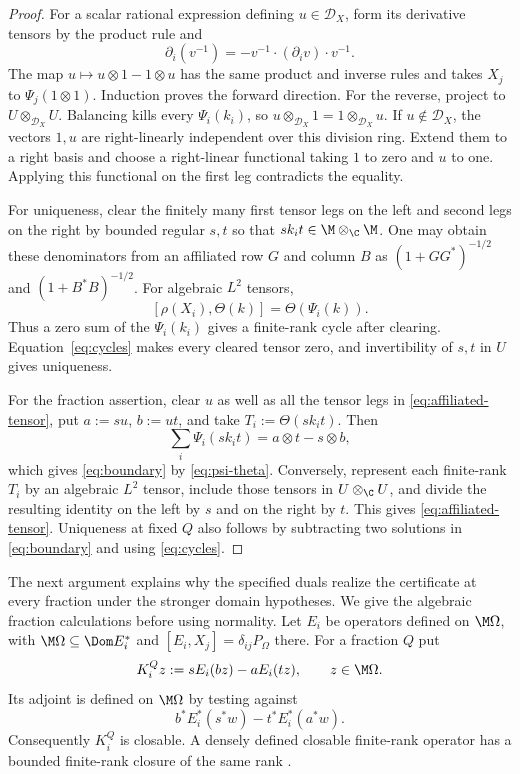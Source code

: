 \begin{proof}
For a scalar rational expression defining $u\in\mathcal D_X$, form its derivative tensors by the product rule and
\[
 \partial_i(v^{-1})=-v^{-1}\cdot(\partial_i v)\cdot v^{-1}.
\]
The map $u\mapsto u\otimes1-1\otimes u$ has the same product and inverse rules and takes $X_j$ to $\Psi_j(1\otimes1)$.
Induction proves the forward direction.
For the reverse, project to $U\otimes_{\mathcal D_X}U$.
Balancing kills every $\Psi_i(k_i)$, so $u\otimes_{\mathcal D_X}1=1\otimes_{\mathcal D_X}u$.
If $u\notin\mathcal D_X$, the vectors $1,u$ are right-linearly independent over this division ring.
Extend them to a right basis and choose a right-linear functional taking $1$ to zero and $u$ to one.
Applying this functional on the first leg contradicts the equality.

For uniqueness, clear the finitely many first tensor legs on the left and second legs on the right by bounded regular $s,t$ so that $sk_it\in\M\otimes_\C\M$.
One may obtain these denominators from an affiliated row $G$ and column $B$ as $(1+GG^*)^{-1/2}$ and $(1+B^*B)^{-1/2}$.
For algebraic $L^2$ tensors,
\begin{equation}\label{eq:psi-theta}
 [\rho(X_i),\Theta(k)]=\Theta(\Psi_i(k)).
\end{equation}
Thus a zero sum of the $\Psi_i(k_i)$ gives a finite-rank cycle after clearing.
Equation~\eqref{eq:cycles} makes every cleared tensor zero, and invertibility of $s,t$ in $U$ gives uniqueness.

For the fraction assertion, clear $u$ as well as all the tensor legs in \eqref{eq:affiliated-tensor}, put $a:=su$, $b:=ut$, and take $T_i:=\Theta(sk_it)$.
Then
\[
 \sum_i\Psi_i(sk_it)=a\otimes t-s\otimes b,
\]
which gives \eqref{eq:boundary} by \eqref{eq:psi-theta}.
Conversely, represent each finite-rank $T_i$ by an algebraic $L^2$ tensor, include those tensors in $U\otimes_\C U$, and divide the resulting identity on the left by $s$ and on the right by $t$.
This gives \eqref{eq:affiliated-tensor}.
Uniqueness at fixed $Q$ also follows by subtracting two solutions in \eqref{eq:boundary} and using \eqref{eq:cycles}.
\end{proof}

The next argument explains why the specified duals realize the certificate at every fraction under the stronger domain hypotheses.
We give the algebraic fraction calculations before using normality.
Let $E_i$ be operators defined on $\M\Omega$, with $\M\Omega\subseteq\Dom E_i^*$ and $[E_i,X_j]=\delta_{ij}P_\Omega$ there.
For a fraction $Q$ put
\[
 K_i^Qz:=sE_i(bz)-aE_i(tz),\qquad z\in\M\Omega.
\]
Its adjoint is defined on $\M\Omega$ by testing against
\begin{equation}\label{eq:fraction-adjoint}
 b^*E_i^*(s^*w)-t^*E_i^*(a^*w).
\end{equation}
Consequently $K_i^Q$ is closable.
A densely defined closable finite-rank operator has a bounded finite-rank closure of the same rank \cite[Problem~III.5.18]{Kat95}.

